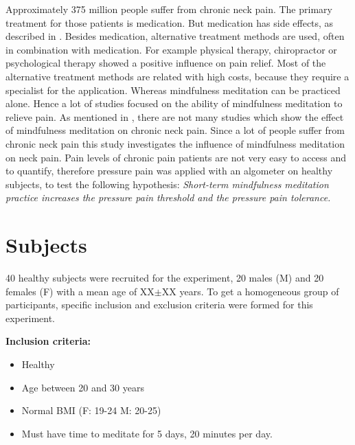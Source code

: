 Approximately 375 million people suffer from chronic neck pain. The primary treatment for those patients is medication. But medication has side effects, as described in .  Besides medication, alternative treatment methods are used, often in combination with medication. For example physical therapy, chiropractor or psychological therapy showed a positive influence on pain relief. Most of the alternative treatment methods are related with high costs, because they require a specialist for the application. Whereas mindfulness meditation can be  practiced alone. Hence a lot of studies focused on the ability of mindfulness meditation to relieve pain.
As mentioned in , there are not many studies which show the effect of mindfulness meditation on chronic neck pain. Since a lot of people suffer from chronic neck pain this study investigates the influence of mindfulness meditation on neck pain. Pain levels of chronic pain patients are not very easy to access and to quantify, therefore pressure pain was applied with an algometer on healthy subjects, to test the following hypothesis:
\textit{Short-term mindfulness meditation practice increases the pressure pain threshold and the pressure pain tolerance.}


\section{Subjects}
40 healthy subjects were recruited for the experiment, 20 males (M) and 20 females
(F) with a mean age of XX$\pm$XX years. To get a homogeneous group of participants, specific inclusion and exclusion criteria were  formed for this experiment.

\textbf{Inclusion criteria:}
\vspace{-.5cm}
\begin{itemize}
	\item Healthy
	\vspace{-.3cm}
	\item Age between 20 and 30 years
	\vspace{-.3cm}
	\item Normal BMI (F: 19-24 M: 20-25)
	\vspace{-.3cm}
	\item Must have time to meditate for 5 days, 20 minutes per day.
\end{itemize}

